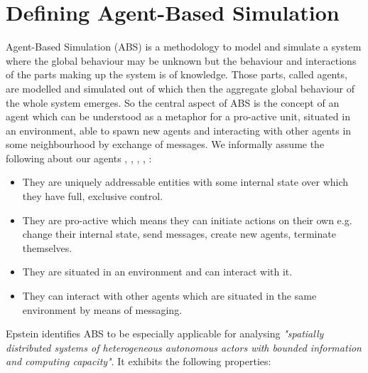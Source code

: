 \section{Defining Agent-Based Simulation}
Agent-Based Simulation (ABS) is a methodology to model and simulate a system where the global behaviour may be unknown but the behaviour and interactions of the parts making up the system is of knowledge. Those parts, called agents, are modelled and simulated out of which then the aggregate global behaviour of the whole system emerges. So the central aspect of ABS is the concept of an agent which can be understood as a metaphor for a pro-active unit, situated in an environment, able to spawn new agents and interacting with other agents in some neighbourhood by exchange of messages. 
We informally assume the following about our agents \cite{siebers_introduction_2008}, \cite{wooldridge_introduction_2009}, \cite{siebers_discrete-event_2010}, \cite{dawson_opening_2014}, \cite{macal_everything_2016}:

\begin{itemize}
	\item They are uniquely addressable entities with some internal state over which they have full, exclusive control.
	\item They are pro-active which means they can initiate actions on their own e.g. change their internal state, send messages, create new agents, terminate themselves.
	\item They are situated in an environment and can interact with it.
	\item They can interact with other agents which are situated in the same environment by means of messaging.
\end{itemize} 

Epstein \cite{epstein_generative_2012} identifies ABS to be especially applicable for analysing \textit{"spatially distributed systems of heterogeneous autonomous actors with bounded information and computing capacity"}. %
It exhibits the following properties:

